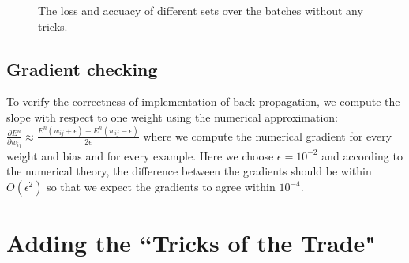 \documentclass{article} %
\begin{document}
\begin{figure} [!htbp]
	
	\caption{The loss and accuacy of different sets over the batches without any tricks. }  
	
\end{figure}

\subsection{Gradient checking}
To verify the correctness of implementation of back-propagation, we compute the slope with respect to one weight using the numerical approximation: $\frac{\partial E^{n}}{\partial w_{ij}} \approx \frac{E^{n}(w_{ij}+\epsilon)-E^{n}(w_{ij}-\epsilon)}{2\epsilon}$ where we compute the numerical gradient for every weight and bias and for every example. Here we choose $\epsilon = 10^{-2}$ and according to the numerical theory, the difference between the gradients should be within $O(\epsilon^{2})$ so that we expect the gradients to agree within $10^{-4}$. 

\section{Adding the “Tricks of the Trade"}
\end{document}
